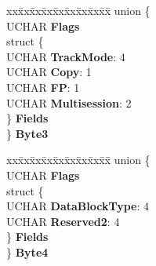 \begin{DoxyCompactItemize}
\begin{tabbing}
\end{tabbing}\item 
\mbox{\label{struct___m_o_d_e___w_r_i_t_e___p_a_r_a_m_s___p_a_g_e___u_s_e_r_a2065d2d92e949dfe1c3e3b5e2445e488}} 
\begin{tabbing}
xx\=xx\=xx\=xx\=xx\=xx\=xx\=xx\=xx\=\kill
union \{\\
\>UCHAR {\bfseries Flags}\\
\>struct \{\\
\>\>UCHAR {\bfseries TrackMode}: 4\\
\>\>UCHAR {\bfseries Copy}: 1\\
\>\>UCHAR {\bfseries FP}: 1\\
\>\>UCHAR {\bfseries Multisession}: 2\\
\>\} {\bfseries Fields}\\
\} {\bfseries Byte3}\\

\end{tabbing}\item 
\mbox{\label{struct___m_o_d_e___w_r_i_t_e___p_a_r_a_m_s___p_a_g_e___u_s_e_r_ad05cbeff056a455ccf1085fedc6225c2}} 
\begin{tabbing}
xx\=xx\=xx\=xx\=xx\=xx\=xx\=xx\=xx\=\kill
union \{\\
\>UCHAR {\bfseries Flags}\\
\>struct \{\\
\>\>UCHAR {\bfseries DataBlockType}: 4\\
\>\>UCHAR {\bfseries Reserved2}: 4\\
\>\} {\bfseries Fields}\\
\} {\bfseries Byte4}\\


\end{tabbing}
\end{DoxyCompactItemize}
